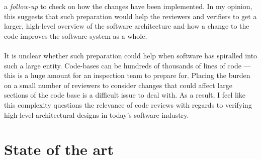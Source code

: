 a {\em follow-up} to check on how the changes have been implemented.
In my opinion, this suggests that such preparation would help the reviewers and verifiers to get a
larger, high-level overview of the software architecture and how a change to the code improves the
software system as a whole.\\
\\
It is unclear whether such preparation could help when software has spiralled into such a large
entity.
Code-bases can be hundreds of thousands of lines of code --- this is a huge amount for an inspection
team to prepare for.
Placing the burden on a small number of reviewers to consider changes that could affect large sections
of the code base is a difficult issue to deal with.
As a result, I feel like this complexity questions the relevance of code reviews with regards to verifying
high-level architectural designs in today's software industry.

\section{State of the art} \label{sec:litsurvey:current}

